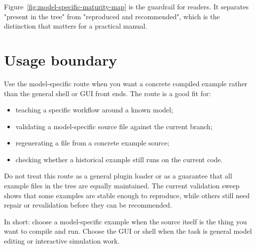 Figure~\ref{fig:model-specific-maturity-map} is the guardrail for readers.
It separates "present in the tree" from "reproduced and recommended", which is
the distinction that matters for a practical manual.

\section{Usage boundary}
\label{sec:model-specific-boundary}

Use the model-specific route when you want a concrete compiled example rather
than the general shell or GUI front ends. The route is a good fit for:
\begin{itemize}
\item teaching a specific workflow around a known model;
\item validating a model-specific source file against the current branch;
\item regenerating a  file from a concrete example source;
\item checking whether a historical example still runs on the current code.
\end{itemize}

Do not treat this route as a general plugin loader or as a guarantee that all
example files in the tree are equally maintained. The current validation sweep
shows that some examples are stable enough to reproduce, while others still
need repair or revalidation before they can be recommended.

In short: choose a model-specific example when the source itself is the thing
you want to compile and run. Choose the GUI or shell when the task is general
model editing or interactive simulation work.
